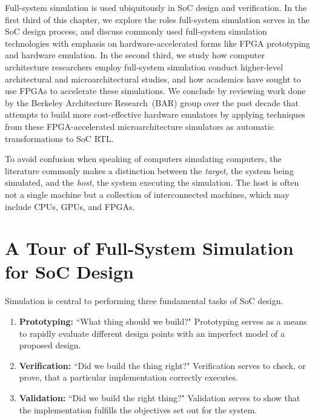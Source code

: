 Full-system simulation is used ubiquitously in SoC design and verification. In
the first third of this chapter, we explore the roles full-system simulation
serves in the SoC design process, and discuss commonly used full-system
simulation technologies with emphasis on hardware-accelerated forms like FPGA
prototyping and hardware emulation.
In the second third, we study how computer architecture researchers employ full-system simulation
conduct higher-level architectural and microarchitectural studies, and how academics have
sought to use FPGAs to accelerate these simulations.
We conclude by reviewing work done by the Berkeley Architecture Research~(BAR)
group over the past decade that attempts to build more cost-effective hardware
emulators by applying techniques from these FPGA-accelerated microarchitecture
simulators as automatic transformations to SoC RTL.

To avoid confusion when speaking of computers simulating computers, the
literature commonly makes a distinction between the \emph{target}, the system
being simulated, and the \emph{host}, the system
executing the simulation. The host is often not a single machine but
a collection of interconnected machines, which may include CPUs,
GPUs, and FPGAs.

\section{A Tour of Full-System Simulation for SoC Design}

Simulation is central to performing three fundamental tasks of SoC design.

\begin{enumerate}

    \item \textbf{Prototyping:} ``What thing should we
        build?" Prototyping serves as a means to rapidly evaluate different
        design points with an imperfect model of a proposed design.

    \item \textbf{Verification:} ``Did we build the thing right?" Verification
        serves to check, or prove, that a particular implementation
        correctly executes.

    \item \textbf{Validation:} ``Did we build the right thing?" Validation
        serves to show that the implementation fulfills the objectives set out
        for the system.

\end{enumerate}

